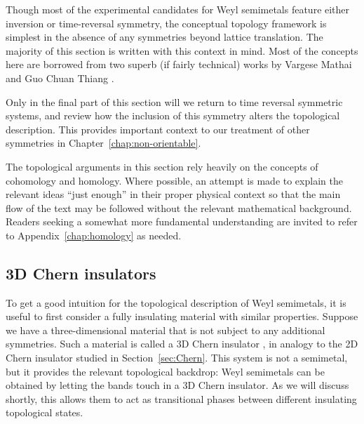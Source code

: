 Though most of the experimental candidates for Weyl semimetals feature either inversion or time-reversal symmetry, the conceptual topology framework is simplest in the absence of any symmetries beyond lattice translation. The majority of this section is written with this context in mind. Most of the concepts here are borrowed from two superb (if fairly technical) works by Vargese Mathai and Guo Chuan Thiang \cite{Mathai_math-review,Mathai_math-paper}.

Only in the final part of this section will we return to time reversal symmetric systems, and review how the inclusion of this symmetry alters the topological description. This provides important context to our treatment of other symmetries in Chapter~\ref{chap:non-orientable}.

The topological arguments in this section rely heavily on the concepts of cohomology and homology. Where possible, an attempt is made to explain the relevant ideas ``just enough'' in their proper physical context so that the main flow of the text may be followed without the relevant mathematical background. Readers seeking a somewhat more fundamental understanding are invited to refer to Appendix~\ref{chap:homology} as needed.

\subsection{3D Chern insulators}

To get a good intuition for the topological description of Weyl semimetals, it is useful to first consider a fully insulating material with similar properties. Suppose we have a three-dimensional material that is not subject to any additional symmetries. Such a material is called a 3D Chern insulator \cite{Vanderbilt_2018,Liu_photonic-Chern-vector,Devescovi_3D-Chern}, in analogy to the 2D Chern insulator studied in Section~\ref{sec:Chern}. This system is not a semimetal, but it provides the relevant topological backdrop: Weyl semimetals can be obtained by letting the bands touch in a 3D Chern insulator. As we will discuss shortly, this allows them to act as transitional phases between different insulating topological states.

